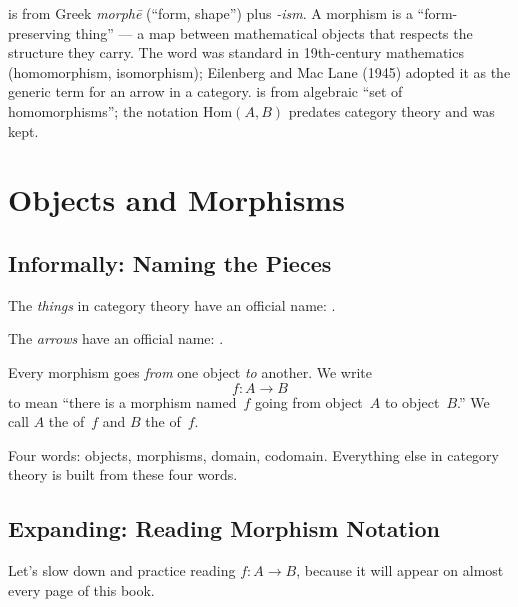 \begin{nameorigin}
 is from Greek \emph{morphē} (``form, shape'') plus
\emph{-ism}. A morphism is a ``form-preserving thing'' — a map between
mathematical objects that respects the structure they carry. The word
was standard in 19th-century mathematics (homomorphism, isomorphism);
Eilenberg and Mac Lane (1945) adopted it as the generic term for an
arrow in a category.  is from algebraic ``set of
homomorphisms''; the notation $\mathrm{Hom}(A, B)$ predates category
theory and was kept.
\end{nameorigin}

\section{Objects and Morphisms}
\label{sec:objects-morphisms}

\subsection{Informally: Naming the Pieces}

The \emph{things} in category theory have an official name: .

The \emph{arrows} have an official name: .

Every morphism goes \emph{from} one object \emph{to} another. We write
\[
  f : A \to B
\]
to mean ``there is a morphism named~$f$ going from object~$A$ to object~$B$.''
We call $A$ the  of~$f$ and $B$ the  of~$f$.

Four words: objects, morphisms, domain, codomain. Everything else in category
theory is built from these four words.

\subsection{Expanding: Reading Morphism Notation}

Let's slow down and practice reading $f : A \to B$, because it will appear on
almost every page of this book.


